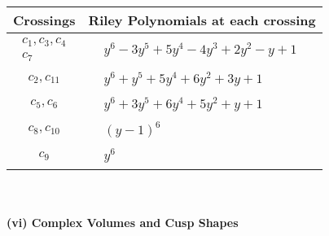 \documentclass[1p]{elsarticle_modified}
\theoremstyle{definition}
\begin{document}
\begin{tabular}{m{50pt}|m{274pt}}
Crossings & \hspace{64pt}Riley Polynomials at each crossing \\
\hline $$\begin{aligned}c_{1},c_{3},c_{4}\\c_{7}\end{aligned}$$&$\begin{aligned}
&y^6-3 y^5+5 y^4-4 y^3+2 y^2- y+1
\end{aligned}$\\
\hline $$\begin{aligned}c_{2},c_{11}\end{aligned}$$&$\begin{aligned}
&y^6+y^5+5 y^4+6 y^2+3 y+1
\end{aligned}$\\
\hline $$\begin{aligned}c_{5},c_{6}\end{aligned}$$&$\begin{aligned}
&y^6+3 y^5+6 y^4+5 y^2+y+1
\end{aligned}$\\
\hline $$\begin{aligned}c_{8},c_{10}\end{aligned}$$&$\begin{aligned}
&(y-1)^6
\end{aligned}$\\
\hline $$\begin{aligned}c_{9}\end{aligned}$$&$\begin{aligned}
&y^6
\end{aligned}$\\
\hline
\end{tabular}\\~\\
\newpage\flushleft \textbf{(vi) Complex Volumes and Cusp Shapes}
\end{document}

